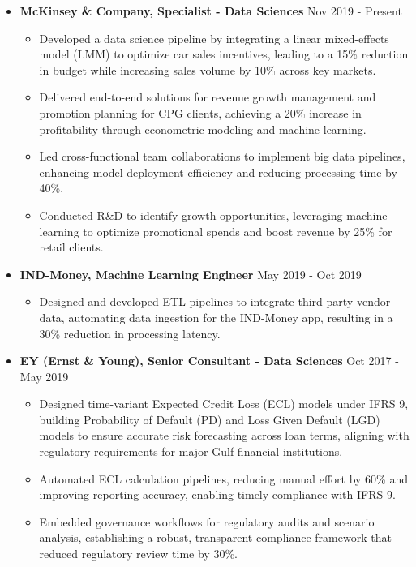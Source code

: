 \documentclass[a4paper,10pt]{article}
\begin{document}
\begin{itemize}[leftmargin=0.15in]
    \item \textbf{McKinsey \& Company, Specialist - Data Sciences} \hfill Nov 2019 - Present
    \begin{itemize}
        \item Developed a data science pipeline by integrating a linear mixed-effects model (LMM) to optimize car sales incentives, leading to a 15\% reduction in budget while increasing sales volume by 10\% across key markets.
        \item Delivered end-to-end solutions for revenue growth management and promotion planning for CPG clients, achieving a 20\% increase in profitability through econometric modeling and machine learning.
        \item Led cross-functional team collaborations to implement big data pipelines, enhancing model deployment efficiency and reducing processing time by 40\%.
        \item Conducted R\&D to identify growth opportunities, leveraging machine learning to optimize promotional spends and boost revenue by 25\% for retail clients.
    \end{itemize}

    \item \textbf{IND-Money, Machine Learning Engineer} \hfill May 2019 - Oct 2019
    \begin{itemize}
        \item Designed and developed ETL pipelines to integrate third-party vendor data, automating data ingestion for the IND-Money app, resulting in a 30\% reduction in processing latency.
    \end{itemize}

    \item \textbf{EY (Ernst \& Young), Senior Consultant - Data Sciences} \hfill Oct 2017 - May 2019
    \begin{itemize}
        \item Designed time-variant Expected Credit Loss (ECL) models under IFRS 9, building Probability of Default (PD) and Loss Given Default (LGD) models to ensure accurate risk forecasting across loan terms, aligning with regulatory requirements for major Gulf financial institutions.
        \item Automated ECL calculation pipelines, reducing manual effort by 60\% and improving reporting accuracy, enabling timely compliance with IFRS 9.
        \item Embedded governance workflows for regulatory audits and scenario analysis, establishing a robust, transparent compliance framework that reduced regulatory review time by 30\%.
    \end{itemize}


\end{itemize}
\end{document}

